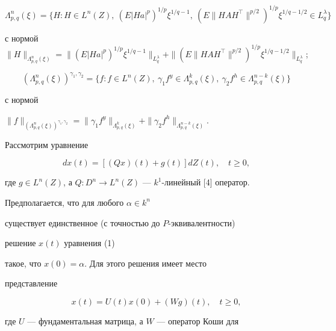 $$ 


\Lambda^n_{p,q}(\xi)=\{H:H\in L^n(Z),\ (E|H a|^p)^{1/p} 


\xi^{1/q-1},\ (E\|H A H^\top\|^{p/2})^{1/p} 


\xi^{1/q-1/2}\in L^\lambda_q\} 


$$ 


с нормой $\|H\|_{\Lambda^n_{p,q}(\xi)}= 


\|(E|H a|^p)^{1/p} 


\xi^{1/q-1}\|_{L^\lambda_q}+\|(E\|H A H^\top\|^{p/2})^{1/p} 


\xi^{1/q-1/2}\|_{L^\lambda_q}$; 


$$ 


(\Lambda^n_{p,q}(\xi))^{\gamma_1,\gamma_2}=\{f:f\in L^n(Z), 


\ \gamma_1f^y\in\Lambda^k_{p,q}(\xi), 


\ \gamma_2f^h\in\Lambda^{n-k}_{p,q}(\xi)\} 


$$ 


с нормой 


$\|f\|_{(\Lambda^n_{p,q}(\xi))^{\gamma_1,\gamma_2}}=


\|\gamma_1f^y\|_{\Lambda^k_{p,q}(\xi)}+ 


\|\gamma_2f^h\|_{\Lambda^{n-k}_{p,q}(\xi)}$. 


 


Рассмотрим уравнение 


\begin{equation} 


d x(t)=[(Q x)(t)+g(t)]d Z(t),\quad t\ge0, 


\end{equation} 


где $g\in L^n(Z)$, а $Q:D^n\to L^n(Z)$ --- $k^1$-линейный [4] оператор. 


Предполагается, что для любого $\alpha\in k^n$ 


существует единственное (с точностью до $P$-эквивалентности) 


решение $x(t)$ уравнения (1)


такое, что $x(0)=\alpha$. Для этого решения имеет место 


представление 


\begin{equation} 


x(t)=U(t)x(0)+(W g)(t),\quad t\ge0, 


\end{equation} 


где $U$ --- фундаментальная матрица, а $W$ --- оператор Коши для 


